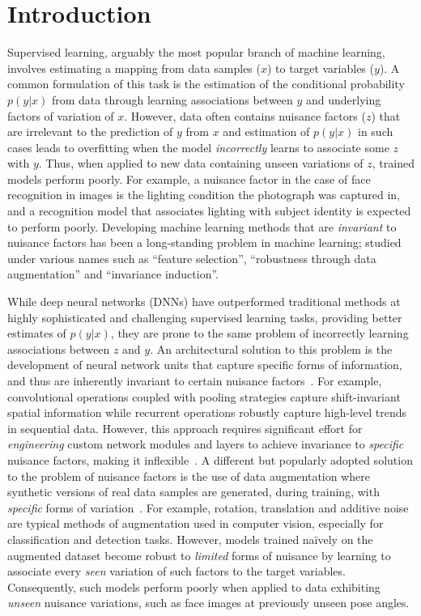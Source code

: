 \section{Introduction}
\label{sec:introduction}

Supervised learning, arguably the most popular branch of machine learning, involves estimating a mapping from data samples ($x$) to target variables ($y$). A common formulation of this task is the estimation of the conditional probability $p(y|x)$ from data through learning associations between $y$ and underlying factors of variation of $x$. However, data often contains nuisance factors ($z$) that are irrelevant to the prediction of $y$ from $x$ and estimation of $p(y|x)$ in such cases leads to overfitting when the model \emph{incorrectly} learns to associate some $z$ with $y$. Thus, when applied to new data containing unseen variations of $z$, trained models perform poorly. For example, a nuisance factor in the case of face recognition in images is the lighting condition the photograph was captured in, and a recognition model that associates lighting with subject identity is expected to perform poorly. Developing machine learning methods that are \emph{invariant} to nuisance factors has been a long-standing problem in machine learning; studied under various names such as ``feature selection'', ``robustness through data augmentation'' and ``invariance induction''.

While deep neural networks (DNNs) have outperformed traditional methods at highly sophisticated and challenging supervised learning tasks, providing better estimates of $p(y|x)$, they are prone to the same problem of incorrectly learning associations between $z$ and $y$. An architectural solution to this problem is the development of neural network units that capture specific forms of information, and thus are inherently invariant to certain nuisance factors~\cite{bib:drl,bib:sai}. For example, convolutional operations coupled with pooling strategies capture shift-invariant spatial information while recurrent operations robustly capture high-level trends in sequential data. However, this approach requires significant effort for \emph{engineering} custom network modules and layers to achieve invariance to \emph{specific} nuisance factors, making it inflexible~\cite{bib:sai}. A different but popularly adopted solution to the problem of nuisance factors is the use of data augmentation where synthetic versions of real data samples are generated, during training, with \emph{specific} forms of variation~\cite{bib:drl}. For example, rotation, translation and additive noise are typical methods of augmentation used in computer vision, especially for classification and detection tasks. However, models trained na\"ively on the augmented dataset become robust to \emph{limited} forms of nuisance by learning to associate every \emph{seen} variation of such factors to the target variables. Consequently, such models perform poorly when applied to data exhibiting \emph{unseen} nuisance variations, such as face images at previously unseen pose angles.%

